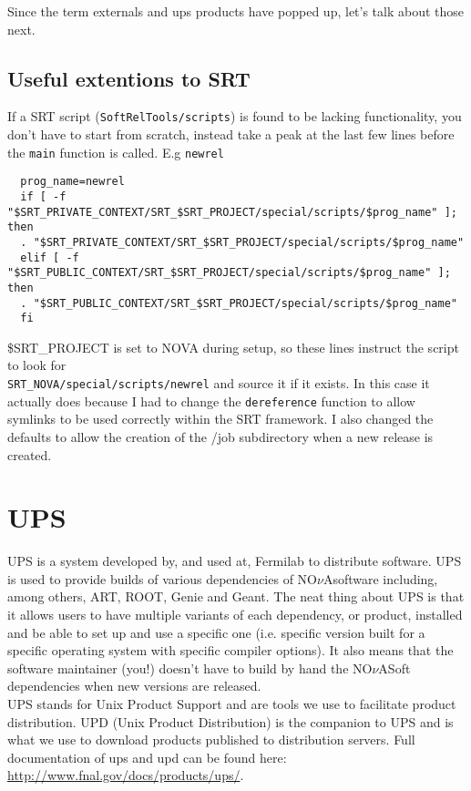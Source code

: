 \documentclass[letterpaper,10pt]{article}
\newcommand{\nova}{NO$\nu$A}
\newcommand{\novas}{\nova \space}
\begin{document}
Since the term externals and ups products have popped up, let's talk about those next.


\subsection{Useful extentions to SRT}
If a SRT script (\verb|SoftRelTools/scripts|) is found to be lacking functionality, you don't have to start from scratch, instead take a peak at the last few lines before the \verb|main| function is called. E.g \verb|newrel|
\begin{verbatim}
  prog_name=newrel
  if [ -f "$SRT_PRIVATE_CONTEXT/SRT_$SRT_PROJECT/special/scripts/$prog_name" ]; then
  . "$SRT_PRIVATE_CONTEXT/SRT_$SRT_PROJECT/special/scripts/$prog_name"
  elif [ -f "$SRT_PUBLIC_CONTEXT/SRT_$SRT_PROJECT/special/scripts/$prog_name" ]; then
  . "$SRT_PUBLIC_CONTEXT/SRT_$SRT_PROJECT/special/scripts/$prog_name"
  fi
\end{verbatim}

\$SRT\_PROJECT is set to NOVA during setup, so these lines instruct the script to look for\\ \verb|SRT_NOVA/special/scripts/newrel| and source it if it exists. In this case it actually does because I had to change the \verb|dereference| function to allow symlinks to be used correctly within the SRT framework. I also changed the defaults to allow the creation of the /job subdirectory when a new release is created.


\section{UPS}

UPS is a system developed by, and used at, Fermilab to distribute software. UPS is used to provide builds of various dependencies of \novas software including, among others, ART, ROOT, Genie and Geant. The neat thing about UPS is that it allows users to have multiple variants of each dependency, or product, installed and be able to set up and use a specific one (i.e. specific version built for a specific operating system with specific compiler options). It also means that the software maintainer (you!) doesn't have to build by hand the \nova Soft dependencies when new versions are released.\\

UPS stands for Unix Product Support and are tools we use to facilitate product distribution. UPD (Unix Product Distribution) is the companion to UPS and is what we use to download products published to distribution servers. Full documentation of ups and upd can be found here: \url{http://www.fnal.gov/docs/products/ups/}.\\
\end{document}
